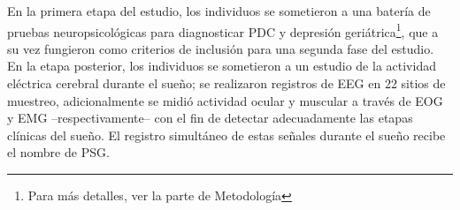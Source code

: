 %

En la primera etapa del estudio,
los individuos se sometieron a una bater\'ia de pruebas
neuropsicol\'ogicas para diagnosticar PDC y depresi\'on geri\'atrica\footnote{Para
m\'as detalles, ver la parte de Metodolog\'ia}, que a su vez fungieron como criterios de
inclusi\'on para una segunda fase del estudio.
En la etapa posterior, los individuos se sometieron a un estudio de la
actividad el\'ectrica cerebral durante el
sue\~no; se realizaron
registros de EEG en 22 sitios de muestreo, adicionalmente se midi\'o
actividad ocular y muscular a trav\'es de EOG y EMG --respectivamente-- con
el fin de detectar adecuadamente las etapas cl\'inicas del sue\~no\cite{AASM07}.
El registro simult\'aneo de estas se\~nales durante el sue\~no recibe el nombre de PSG.

